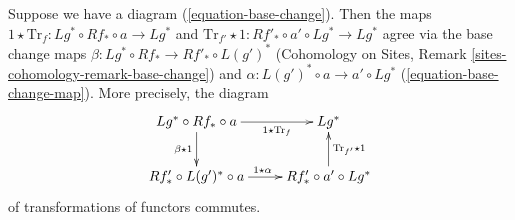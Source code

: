 \begin{lemma}
\label{lemma-trace-map-and-base-change}
Suppose we have a diagram (\ref{equation-base-change}).
Then the maps
$1 \star \text{Tr}_f : Lg^* \circ Rf_* \circ a \to Lg^*$ and
$\text{Tr}_{f'} \star 1 : Rf'_* \circ a' \circ Lg^* \to Lg^*$
agree via the base change maps
$\beta : Lg^* \circ Rf_* \to Rf'_* \circ L(g')^*$
(Cohomology on Sites, Remark \ref{sites-cohomology-remark-base-change})
and $\alpha : L(g')^* \circ a \to a' \circ Lg^*$
(\ref{equation-base-change-map}).
More precisely, the diagram
$$
\xymatrix{
Lg^* \circ Rf_* \circ a
\ar[d]_{\beta \star 1} \ar[r]_-{1 \star \text{Tr}_f} &
Lg^* \\
Rf'_* \circ L(g')^* \circ a \ar[r]^{1 \star \alpha} &
Rf'_* \circ a' \circ Lg^* \ar[u]_{\text{Tr}_{f'} \star 1}
}
$$
of transformations of functors commutes.
\end{lemma}

